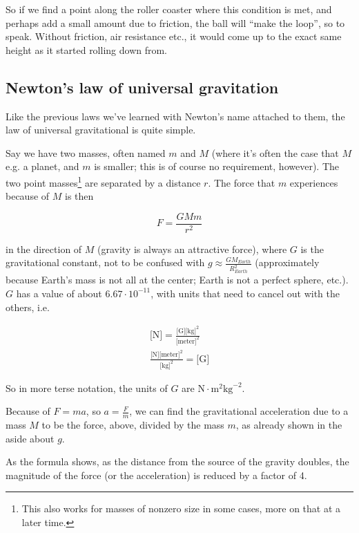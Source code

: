 \documentclass[12pt,a4paper]{report}
\begin{document}
So if we find a point along the roller coaster where this condition is met, and perhaps add a small amount due to friction, the ball will ``make the loop'', so to speak. Without friction, air resistance etc., it would come up to the exact same height as it started rolling down from.

\subsection{Newton's law of universal gravitation}

Like the previous laws we've learned with Newton's name attached to them, the law of universal gravitational is quite simple.

Say we have two masses, often named $m$ and $M$ (where it's often the case that $M$ e.g. a planet, and $m$ is smaller; this is of course no requirement, however). The two point masses\footnote{This also works for masses of nonzero size in some cases, more on that at a later time.} are separated by a distance $r$. The force that $m$ experiences because of $M$ is then

\begin{equation}
F = \frac{G M m}{r^2}
\end{equation}

in the direction of $M$ (gravity is always an attractive force), where $G$ is the gravitational constant, not to be confused with $\displaystyle g \approx \frac{G M_{Earth}}{R_{Earth}^2}$ (approximately because Earth's mass is not all at the center; Earth is not a perfect sphere, etc.).\\
$G$ has a value of about $6.67 \cdot 10^{-11}$, with units that need to cancel out with the others, i.e.

\begin{align}
\text{[N]} = \frac{\text{[G]} \text{[kg]}^2}{\text{[meter]}^2}\\
\frac{\text{[N]} \text{[meter]}^2}{\text{[kg]}^2} = \text{[G]}
\end{align}

So in more terse notation, the units of $G$ are $\text{N} \cdot \text{m}^2 \text{kg}^{-2}$.

Because of $F = ma$, so $\displaystyle a = \frac{F}{m}$, we can find the gravitational acceleration due to a mass $M$ to be the force, above, divided by the mass $m$, as already shown in the aside about $g$.

As the formula shows, as the distance from the source of the gravity doubles, the magnitude of the force (or the acceleration) is reduced by a factor of 4.
\end{document}
